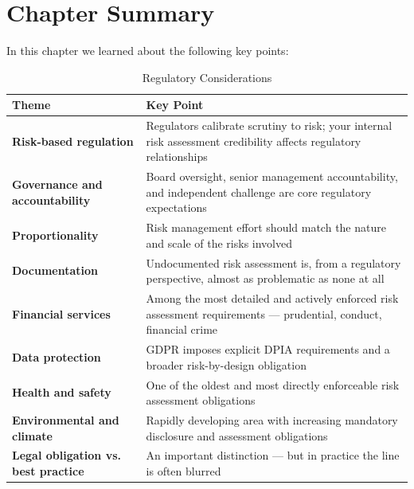 \section{Chapter Summary}
In this chapter we learned about the following key points:
\begin{table}[H]
  \centering
  \renewcommand{\arraystretch}{1.5}
  \begin{tabularx}{\textwidth}{ | >{\raggedright\arraybackslash}p{} 
                                | >{\raggedright\arraybackslash}X | }
    \hline
    \textbf{Theme} & \textbf{Key Point} \\
    \hline
    \textbf{Risk-based regulation} & Regulators calibrate scrutiny to risk; your internal risk assessment credibility affects regulatory relationships \\
    \hline
    \textbf{Governance and accountability} & Board oversight, senior management accountability, and independent challenge are core regulatory expectations \\
    \hline
    \textbf{Proportionality} & Risk management effort should match the nature and scale of the risks involved \\
    \hline
    \textbf{Documentation} & Undocumented risk assessment is, from a regulatory perspective, almost as problematic as none at all \\
    \hline
    \textbf{Financial services} & Among the most detailed and actively enforced risk assessment requirements — prudential, conduct, financial crime \\
    \hline
    \textbf{Data protection} & GDPR imposes explicit DPIA requirements and a broader risk-by-design obligation \\
    \hline
    \textbf{Health and safety} & One of the oldest and most directly enforceable risk assessment obligations \\
    \hline
    \textbf{Environmental and climate} & Rapidly developing area with increasing mandatory disclosure and assessment obligations \\
    \hline
    \textbf{Legal obligation vs. best practice} & An important distinction — but in practice the line is often blurred \\
    \hline
  \end{tabularx}
  \caption{Regulatory Considerations}
\end{table}


